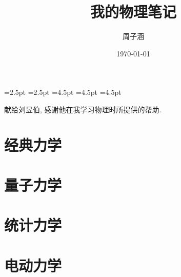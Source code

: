 \documentclass[b5paper,openany]{ctexbook}
\title{我的物理笔记}
\author{周子涵}
\date{\today}
\begin{document}
\maketitle
=2.5pt 
=2.5pt
=4.5pt
=4.5pt
=4.5pt

\vspace*{7cm}
\begin{center}
    {\large 献给刘昱伯, 感谢他在我学习物理时所提供的帮助.}
\end{center}
\frontmatter
\pagestyle{toc} %

\tableofcontents
\pagestyle{plain} %
\mainmatter
\pagestyle{fancy} %
\chapter{经典力学}




\chapter{量子力学}








\chapter{统计力学}





\chapter{电动力学}





\end{document}
